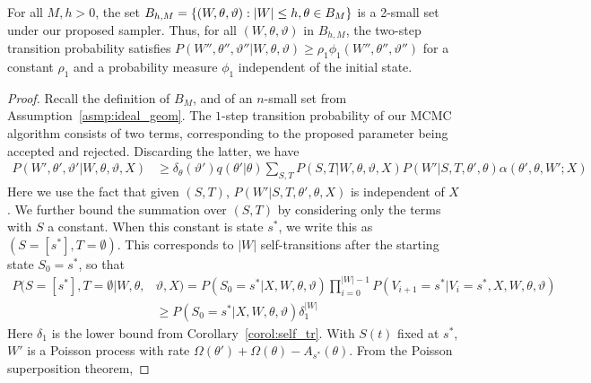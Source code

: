 \begin{lemma}
  For all $M,h > 0$, the set $B_{h,M} =
\left\lbrace (W, \theta, \vartheta) : |W| \leq h, \theta \in B_M
\right\rbrace$ is a 2-small set under our proposed sampler. 
Thus, for all $(W,\theta,\vartheta)$ {in $B_{h, M}$},
the two-step transition probability satisfies 
$P(W'', \theta'',\vartheta'' | W, \theta, \vartheta) \ge \rho_1 
\phi_1(W{''}, \theta'',\vartheta'') $ for a constant $\rho_1$ and a 
probability measure $\phi_1$ independent of the initial state.
\label{lem:small_set}
\end{lemma}
\begin{proof} Recall the definition of $B_M$, and of an $n$-small set from 
  Assumption~\ref{asmp:ideal_geom}. The $1$-step transition probability of our MCMC algorithm
  consists of two terms, corresponding to the proposed parameter being
  accepted and rejected. Discarding the latter, we have %
\begin{align*}
  P(W',\theta',\vartheta'|W,\theta,\vartheta,X)&\geq
  \delta_\theta(\vartheta') q(\theta'|\theta)
 \sum_{S,T}  P(S,T | W, \theta, \vartheta, X) 
             P(W'| S, T, \theta', \theta)
             \alpha(\theta', \theta, W';X)
\end{align*}
Here we use the fact that given $(S,T)$,
$P(W'|S,T,\theta',\theta,X)$ is independent of  $X$.
We further bound the summation over $(S,T)$ by considering only the terms
with $S$ a constant. When this constant is  state $s^*$, we write this as 
$(S=[s^*], T= \emptyset)$. This corresponds to $|W|$ self-transitions 
after the starting state $S_0=s^*$, so that
\vspace{-.1in}
\begin{align*}
  P(S=[s^*], T = \emptyset | W, \theta, &\vartheta, X) =
P(S_0=s^*|X,W, \theta, \vartheta)\prod_{i = 0}^{|W| - 1} 
P(V_{i + 1} = s^* | V_i = s^*,X,W,\theta,\vartheta) \\ 
& \geq P(S_0=s^*|X,W, \theta, \vartheta)\delta_1^{|W|} %
\end{align*}
Here $\delta_1$ is the lower bound from Corollary~\ref{corol:self_tr}.
With $S(t)$ fixed at $s^*$, $W'$ is a Poisson process with rate
$\Omega(\theta') + \Omega(\theta) - A_{s^*}(\theta)$.
From the %
Poisson superposition theorem,

\end{proof}
